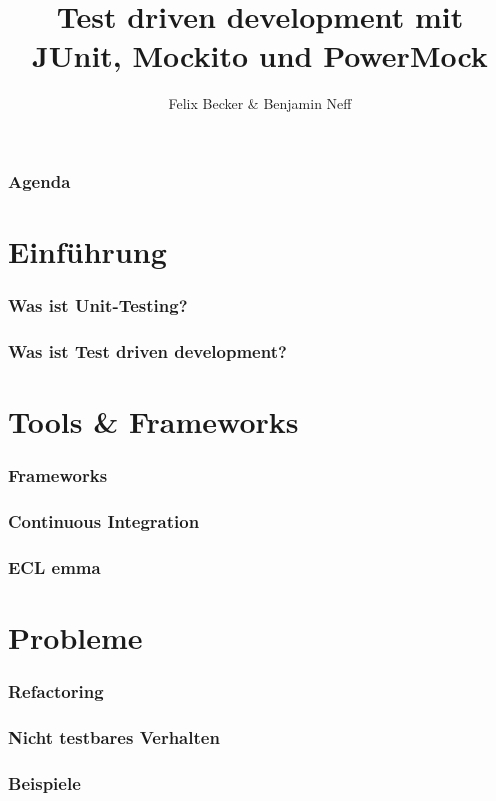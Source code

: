 \documentclass{beamer}
\title{Test driven development mit JUnit, Mockito und PowerMock}
\institute{Computerseminar Tondorf 2011}
\author[F. Becker, B. Neff]{
        Felix Becker \& 
	Benjamin Neff
}
\begin{document}
	\begin{frame}
		\titlepage
	\end{frame}

	\begin{frame}
		\frametitle{Agenda}
		\setcounter{tocdepth}{1}
		\tableofcontents
	\end{frame}
	

	\section{Einführung}
	
		\begin{frame}
			\frametitle{Was ist Unit-Testing?}
		\end{frame}

		\begin{frame}
			\frametitle{Was ist Test driven development?}
		\end{frame}

	
	\section{Tools \& Frameworks}
		\begin{frame}
			\frametitle{Frameworks}
		\end{frame}

		\begin{frame}
			\frametitle{Continuous Integration}
		\end{frame}

		\begin{frame}
			\frametitle{ECL emma}
		\end{frame}

	
	\section{Probleme}
		\begin{frame}
			\frametitle{Refactoring}
		\end{frame}

		\begin{frame}
			\frametitle{Nicht testbares Verhalten}
		\end{frame}

		\begin{frame}
			\frametitle{Beispiele}
		\end{frame}
\end{document}
